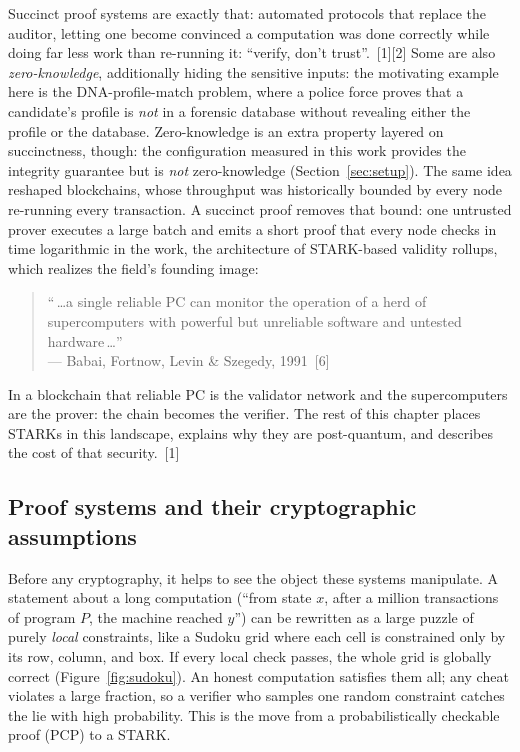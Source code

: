 \documentclass[11pt]{article}
\begin{document}
Succinct proof systems are exactly that: automated protocols that replace the auditor, letting one become
convinced a computation was done correctly while doing far less work than re-running it: ``verify,
don't trust''.~[1][2] Some are also \emph{zero-knowledge}, additionally hiding the sensitive inputs: the
motivating example here is the DNA-profile-match problem, where a police force proves that a candidate's
profile is \emph{not} in a forensic database without revealing either the profile or the database.
Zero-knowledge is an extra property layered on succinctness, though: the configuration measured in this
work provides the integrity guarantee but is \emph{not} zero-knowledge (Section~\ref{sec:setup}). The
same idea reshaped blockchains, whose throughput was historically bounded by every node re-running every
transaction. A succinct proof removes that bound: one untrusted prover executes a large batch and emits
a short proof that every node checks in time logarithmic in the work, the architecture of STARK-based
validity rollups, which realizes the field's founding image:

\begin{quote}
``\,\ldots a single reliable PC can monitor the operation of a herd of supercomputers with powerful
but unreliable software and untested hardware\,\ldots''\\[2pt]
\hspace*{1em}--- Babai, Fortnow, Levin \& Szegedy, 1991~[6]
\end{quote}

In a blockchain that reliable PC is the validator network and the supercomputers are the prover: the
chain becomes the verifier. The rest of this chapter places STARKs in this landscape, explains why they
are post-quantum, and describes the cost of that security.~[1]

\subsection{Proof systems and their cryptographic assumptions}

Before any cryptography, it helps to see the object these systems manipulate. A statement about a long
computation (``from state $x$, after a million transactions of program $P$, the machine reached
$y$'') can be rewritten as a large puzzle of purely \emph{local} constraints, like a Sudoku grid
where each cell is constrained only by its row, column, and box. If every local check passes, the whole
grid is globally correct (Figure~\ref{fig:sudoku}). An honest computation satisfies them all; any cheat
violates a large fraction, so a verifier who samples one random constraint catches the lie with high
probability. This is the move from a probabilistically checkable proof (PCP) to a STARK.
\end{document}
